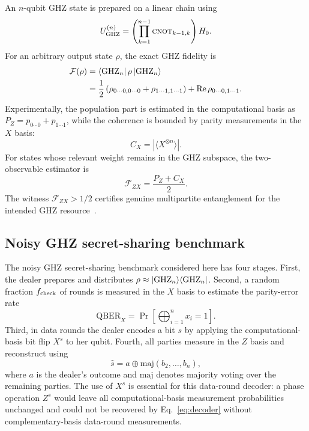 \documentclass[aip,amsmath,amssymb,reprint,longbibliography]{revtex4-2}
\newcommand{\ghz}{\mathrm{GHZ}}
\newcommand{\cnot}{\textsc{cnot}}
\newcommand{\qber}{\mathrm{QBER}}
\newcommand{\fid}{\mathcal{F}}
\begin{document}
An $n$-qubit GHZ state is prepared on a linear chain using
\begin{equation}
U_{\ghz}^{(n)}=\left(\prod_{k=1}^{n-1}\cnot_{k-1,k}\right)H_0.
\label{eq:ghz_circuit}
\end{equation}
For an arbitrary output state $\rho$, the exact GHZ fidelity is~\cite{NielsenChuang2010}
\begin{align}
\fid(\rho)&=\bra{\ghz_n}\rho\ket{\ghz_n} \\
&=\frac{1}{2}\left(\rho_{0\cdots0,0\cdots0}+\rho_{1\cdots1,1\cdots1}\right)
+\mathrm{Re}\,\rho_{0\cdots0,1\cdots1}.
\label{eq:exact_fidelity}
\end{align}
Experimentally, the population part is estimated in the computational basis as $P_Z=p_{0\cdots0}+p_{1\cdots1}$, while the coherence is bounded by parity measurements in the $X$ basis:
\begin{equation}
C_X=|\langle X^{\otimes n}\rangle|.
\label{eq:cx_def}
\end{equation}
For states whose relevant weight remains in the GHZ subspace, the two-observable estimator is
\begin{equation}
\fid_{ZX}=\frac{P_Z+C_X}{2}.
\label{eq:two_observable_fidelity}
\end{equation}
The witness $\fid_{ZX}>1/2$ certifies genuine multipartite entanglement for the intended GHZ resource~\cite{Guhne2009,Toth2005}.

\subsection{Noisy GHZ secret-sharing benchmark}
\label{subsec:hbb}

The noisy GHZ secret-sharing benchmark considered here has four stages.  First, the dealer prepares and distributes $\rho\approx\ket{\ghz_n}\!\bra{\ghz_n}$.  Second, a random fraction $f_{\rm check}$ of rounds is measured in the $X$ basis to estimate the parity-error rate
\begin{equation}
\qber_X=\Pr\left[\bigoplus_{i=1}^n x_i=1\right].
\label{eq:qberx}
\end{equation}
Third, in data rounds the dealer encodes a bit $s$ by applying the computational-basis bit flip $X^s$ to her qubit.  Fourth, all parties measure in the $Z$ basis and reconstruct using
\begin{equation}
\hat{s}=a\oplus \mathrm{maj}(b_2,\ldots,b_n),
\label{eq:decoder}
\end{equation}
where $a$ is the dealer's outcome and $\mathrm{maj}$ denotes majority voting over the remaining parties.  The use of $X^s$ is essential for this data-round decoder: a phase operation $Z^s$ would leave all computational-basis measurement probabilities unchanged and could not be recovered by Eq.~\eqref{eq:decoder} without complementary-basis data-round measurements.
\end{document}
